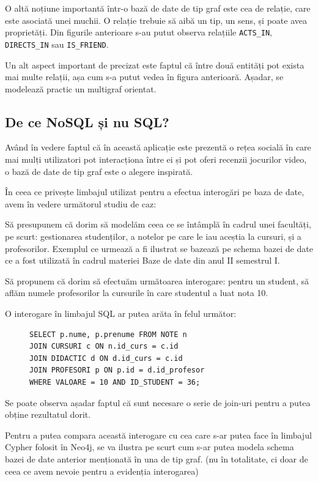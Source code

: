 \documentclass[12pt,a4paper]{report}
\begin{document}
O altă noțiune importantă într-o bază de date de tip graf este cea de relație, care este asociată unei muchii. 
O relație trebuie să aibă un tip, un sens, și poate avea proprietăți.
Din figurile anterioare s-au putut observa relațiile \texttt{ACTS\_IN}, \texttt{DIRECTS\_IN} sau \texttt{IS\_FRIEND}.

Un alt aspect important de precizat este faptul că între două entități pot exista mai multe relații, așa cum s-a putut vedea în figura anterioară. Așadar, se modelează practic un multigraf orientat.

\subsection{De ce NoSQL și nu SQL?}

Având în vedere faptul că în această aplicație este prezentă o rețea socială în care mai mulți utilizatori pot interacționa între ei și pot oferi recenzii jocurilor video, o bază de date de tip graf este o alegere inspirată.

În ceea ce privește limbajul utilizat pentru a efectua interogări pe baza de date, avem în vedere următorul studiu de caz:

Să presupunem că dorim să modelăm ceea ce se întâmplă în cadrul unei facultăți, pe scurt: gestionarea studenților, a notelor pe care le iau aceștia la cursuri, și a profesorilor.
Exemplul ce urmează a fi ilustrat se bazează pe schema bazei de date ce a fost utilizată în cadrul materiei Baze de date din anul II semestrul I. \cite{7}

Să propunem că dorim să efectuăm următoarea interogare: pentru un student, să aflăm numele profesorilor la cursurile în care studentul a luat nota 10.

O interogare în limbajul SQL ar putea arăta în felul următor:

\begin{figure}[h]
\centering
\begin{BVerbatim}
SELECT p.nume, p.prenume FROM NOTE n 
JOIN CURSURI c ON n.id_curs = c.id
JOIN DIDACTIC d ON d.id_curs = c.id
JOIN PROFESORI p ON p.id = d.id_profesor
WHERE VALOARE = 10 AND ID_STUDENT = 36;
\end{BVerbatim}
\end{figure}


Se poate observa așadar faptul că sunt necesare o serie de join-uri pentru a putea obține rezultatul dorit.


Pentru a putea compara această interogare cu cea care s-ar putea face în limbajul Cypher folosit în Neo4j, se va ilustra pe scurt cum s-ar putea modela schema bazei de date anterior menționată în una de tip graf. (nu în totalitate, ci doar de ceea ce avem nevoie pentru a evidenția interogarea)
\end{document}
